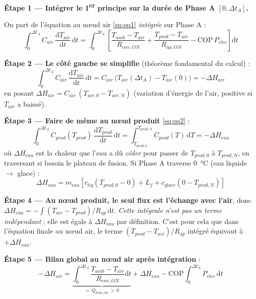 \documentclass[11pt,a4paper]{article}
\begin{document}
\begin{demo}
\textbf{Étape 1 — Intégrer le 1\textsuperscript{er} principe sur la durée de Phase A
$[0, \Delta t_A]$.}

On part de l'équation au nœud air \eqref{eq:eq1} \emph{intégrée} sur Phase A :
\begin{equation}
\int_0^{\Delta t_A} C_{air}\,\frac{\mathrm{d}T_{air}}{\mathrm{d}t}\,\mathrm{d}t
= \int_0^{\Delta t_A}\!\!\left[\frac{T_{amb}-T_{air}}{R_{env,ON}} + \frac{T_{prod}-T_{air}}{R_{ap,ON}} - \mathrm{COP}\,P_{elec}\right]\!\mathrm{d}t
\end{equation}

\textbf{Étape 2 — Le côté gauche se simplifie} (théorème fondamental du calcul) :
\begin{equation}
\int_0^{\Delta t_A} C_{air}\,\frac{\mathrm{d}T_{air}}{\mathrm{d}t}\,\mathrm{d}t
= C_{air}\,\big(T_{air}(\Delta t_A) - T_{air}(0)\big)
= -\Delta H_{air}
\end{equation}
en posant $\Delta H_{air} = C_{air}\,(T_{air,0} - T_{air,N})$ (variation d'énergie de l'air,
positive si $T_{air}$ a baissé).

\textbf{Étape 3 — Faire de même au nœud produit} \eqref{eq:eq2} :
\begin{equation}
\int_0^{\Delta t_A} C_{prod}(T_{prod})\,\frac{\mathrm{d}T_{prod}}{\mathrm{d}t}\,\mathrm{d}t
= \int_{T_{prod,0}}^{T_{prod,N}}\!\!C_{prod}(T)\,\mathrm{d}T = -\Delta H_{eau}
\end{equation}
où $\Delta H_{eau}$ est la chaleur que l'eau a dû \emph{céder} pour passer de
$T_{prod,0}$ à $T_{prod,N}$, en traversant si besoin le plateau de fusion. Si Phase A
traverse \SI{0}{\celsius} (eau liquide $\to$ glace) :
\begin{equation}
\Delta H_{eau} = m_{eau}\!\left[c_{liq}(T_{prod,0} - 0) + L_f + c_{glace}(0 - T_{prod,N})\right]
\label{eq:dHeau_A}
\end{equation}

\textbf{Étape 4 — Au nœud produit, le seul flux est l'échange avec l'air}, donc
$\Delta H_{eau} = -\int (T_{air}-T_{prod})/R_{ap}\,\mathrm{d}t$. \emph{Cette intégrale
n'est pas un terme indépendant} : elle est égale à $\Delta H_{eau}$ par définition. C'est
pour cela que dans l'équation finale au nœud air, le terme $(T_{prod}-T_{air})/R_{ap}$
intégré équivaut à $+\Delta H_{eau}$.

\textbf{Étape 5 — Bilan global au nœud air après intégration} :
\begin{equation}
-\Delta H_{air} = \underbrace{\int_0^{\Delta t_A}\!\!\frac{T_{amb}-T_{air}}{R_{env,ON}}\mathrm{d}t}_{=\,Q_{leak,int}\,>\,0}
+ \Delta H_{eau} - \mathrm{COP}\!\!\int_0^{\Delta t_A}\!\!P_{elec}\,\mathrm{d}t
\end{equation}


\end{demo}
\end{document}
